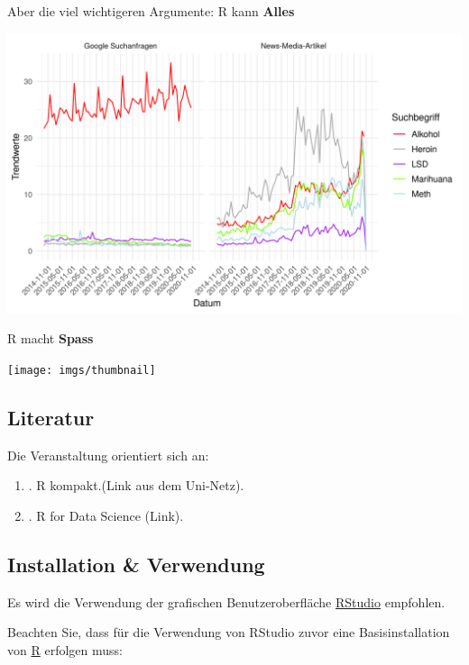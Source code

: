 \documentclass[
]{book}
\begin{document}
Aber die viel wichtigeren Argumente:
R kann \textbf{Alles}

\begin{center}\includegraphics[width=0.7\linewidth]{imgs/drugs} \end{center}

R macht \textbf{Spass}

\begin{center}\texttt{[image: imgs/thumbnail]} \end{center}

\hypertarget{literatur}{%
\subsection*{Literatur}\label{literatur}}

Die Veranstaltung orientiert sich an:

\begin{enumerate}
\def\labelenumi{\arabic{enumi}.}
\item
  \citet{wollschlaegerKompaktSchnelleEinstieg2016} . R kompakt.(Link aus dem Uni-Netz).
\item
  \citet{grolemundDataScience} . R for Data Science (Link).
\end{enumerate}

\hypertarget{installation-verwendung}{%
\subsection*{Installation \& Verwendung}\label{installation-verwendung}}

Es wird die Verwendung der grafischen Benutzeroberfläche \href{http://www.rstudio.com}{RStudio} empfohlen.

Beachten Sie, dass für die Verwendung von RStudio zuvor eine Basisinstallation von \href{http://cran.r-project.org}{R} erfolgen muss:
\end{document}
